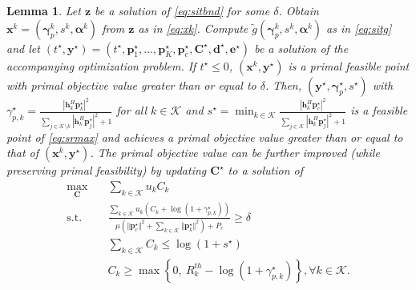 \documentclass[a4paper,10pt,journal]{IEEEtran}
\let\vec\bm
\newtheorem{lemma}{Lemma}
\begin{document}
\begin{lemma} \label{lem:sitfeas}
	Let $\vec z$ be a solution of \cref{eq:sitbnd} for some $\delta$.
	Obtain $\vec x^k = (\vec \gamma_p^k, s^k, \vec\alpha^k)$ from $\vec z$ as in \cref{eq:xk}.
	Compute $\tilde g(\vec\gamma_p^k, s^k, \vec\alpha^k)$ as in \cref{eq:sitg} and
	let $(t^\star, \vec y^\star) = (t^\star, \vec p_1^\star, \dots, \vec p_K^\star, \vec p_c^\star, \vec C^\star, \vec d^\star, \vec e^\star)$ be a solution of the accompanying optimization problem.
	If $t^\star \le 0$, $(\vec x^k, \vec y^\star)$ is a primal feasible point with primal objective value greater than or equal to $\delta$.
	Then, $(\vec y^\star, \vec \gamma_p^\star, s^\star)$ with $\gamma_{p,k}^\star = \frac{|{\vec{h}}_{k}^{H}\vec{p}_{k}^\star|^2}{\sum\limits_{j\in\mathcal{K}\setminus k}|\vec{h}_{k}^{H}\vec{p}_{j}^\star|^2+1}$ for all $k\in\mathcal{K}$ and $s^\star = \min_{k\in\mathcal K} \frac{|{\vec{h}}_{k}^{H}\vec{p}_{c}^\star|^2}{\sum\limits_{j\in\mathcal{K}}|\vec{h}_{k}^{H}\vec{p}_{j}^\star|^2+1}$ is a feasible point of \cref{eq:srmax} and achieves a primal objective value greater than or equal to that of $(\vec x^k, \vec y^\star)$.
	The primal objective value can be further improved (while preserving primal feasibility) by updating $\vec C^\star$ to a solution of
	\begin{subequations} \label{eq:bestC}
		\begin{align}
			\max_{\vec C} \quad & \sum_{k\in\mathcal K} u_k C_k \\
		\mbox{s.t.}\quad
	&  \frac{\sum_{k\in\mathcal{K}} u_k \left( C_k + \log(1+\gamma_{p,k}^\star) \right)}{\mu \left( \Vert \vec p_c^\star \Vert^2 + \sum_{k\in\mathcal K} \Vert \vec p_k^\star \Vert^2 \right) + P_c} \ge \delta \label{eq:bestC:1} \\
		& \sum_{k\in \mathcal{K}}C_{k}\leq \log(1+s^\star) \label{eq:bestC:2} \\
		& C_k \geq \max \left\{ 0,\ R_k^{th} - \log(1+\gamma_{p,k}^\star) \right\}, \forall k\in\mathcal{K}. \label{eq:bestC:3}
		\end{align}
	\end{subequations}
\end{lemma}
\end{document}
